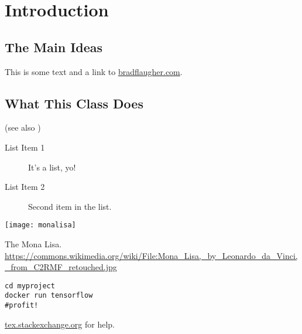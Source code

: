 \setchapterpreamble[u]{\margintoc}
\chapter{Introduction}

\section{The Main Ideas}

This is some text and a link to 
\href{https://bradflaugher.com}{bradflaugher.com}.  

\section{What This Class Does}

(see also ) 

\begin{description}
	\item[List Item 1] It's a list, yo!
	\item[List Item 2] Second item in the list.
\end{description}

\begin{marginfigure}[-5.5cm]
	\texttt{[image: monalisa]}
	\caption[The Mona Lisa]{The Mona Lisa.\\ 
	\url{https://commons.wikimedia.org/wiki/File:Mona_Lisa,_by_Leonardo_da_Vinci,_from_C2RMF_retouched.jpg}}
\end{marginfigure}


\begin{lstlisting}[style=kaolstplain,linewidth=1.5\textwidth]
cd myproject
docker run tensorflow
#profit!
\end{lstlisting}

\url{tex.stackexchange.org} for help.
